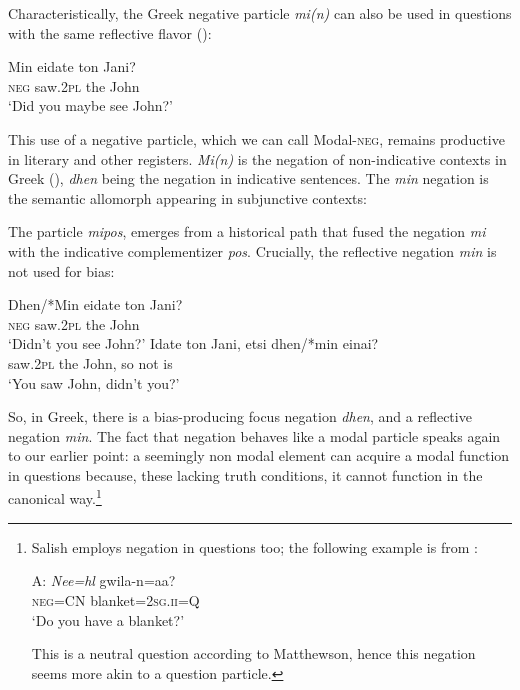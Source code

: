 \documentclass[output=paper,colorlinks,citecolor=brown]{langscibook}
\begin{document}
Characteristically, the Greek negative particle \textit{mi(n)} can also be used in questions with the same reflective flavor (\citealt{chatzopoulou2019}):

\ea
\gll Min eidate ton Jani?\\
\textsc{neg} saw\textsc{.2pl} the John\\
\glt `Did you maybe see John?'
\z


This use of a negative particle, which we can call Modal-\textsc{neg}, remains productive in literary and other registers. \textit{Mi(n)} is the negation of non-indicative contexts in Greek (\citealt{giannakidou1997, Veloudis1980}), \textit{dhen} being the negation in indicative sentences. The \textit{min} negation is the semantic allomorph appearing in subjunctive contexts:

\z


The particle \textit{mipos}, emerges from a historical path that fused the negation \textit{mi}  with the indicative complementizer \textit{pos}.  Crucially, the reflective negation \textit{min} is not used for bias:


\ea
\gll Dhen/*Min eidate ton Jani?\\
\textsc{neg} saw\textsc{.2pl} the John\\
\glt `Didn't  you see John?'
\ex
\gll  Idate ton Jani, etsi dhen/*min einai? \\
saw\textsc{.2pl} the John, so not is \\
\glt `You saw John, didn't you?'
\z

So, in Greek, there is a bias-producing focus negation \textit{dhen}, and a reflective negation \textit{min}. The fact that negation behaves like a modal particle speaks again to our earlier point: a seemingly non modal element can acquire a modal function in questions because, these lacking truth conditions, it cannot function in the canonical way.\footnote{Salish employs negation in questions too; the following example is from \citet{matthewson2022}:

\ea A: \gll 
\textit{Nee=hl} gwila-n=aa? \\
\textsc{neg=CN} blanket\textsc{=2sg.ii=Q}\\ 
\glt `Do you have a blanket?'
\z

This is a neutral question according to Matthewson, hence this negation seems more akin to a question particle. }
\end{document}
